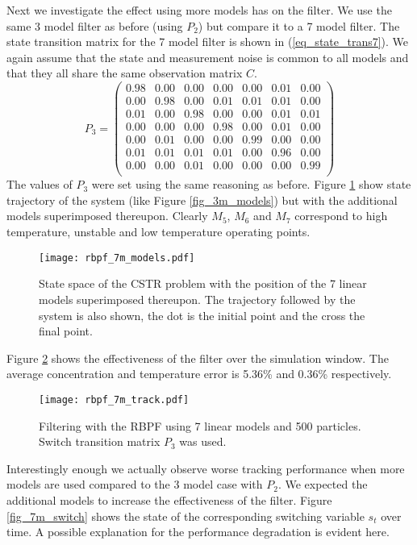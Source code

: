Next we investigate the effect using more models has on the filter. We use the same 3 model filter as before (using $P_2$) but compare it to a 7 model filter. The state transition matrix for the 7 model filter is shown in (\ref{eq_state_trans7}). We again assume that the state and measurement noise is common to all models and that they all share the same observation  matrix $C$.
\begin{equation}
P_3 = \begin{pmatrix}
0.98 & 0.00 & 0.00 & 0.00 & 0.00 & 0.01 & 0.00 \\
0.00 & 0.98 & 0.00 & 0.01 & 0.01 & 0.01 & 0.00 \\
0.01 & 0.00 & 0.98 & 0.00 & 0.00 & 0.01 & 0.01 \\
0.00 & 0.00 & 0.00 & 0.98 & 0.00 & 0.01 & 0.00 \\
0.00 & 0.01 & 0.00 & 0.00 & 0.99 & 0.00 & 0.00 \\
0.01 & 0.01 & 0.01 & 0.01 & 0.00 & 0.96 & 0.00 \\
0.00 & 0.00 & 0.01 & 0.00 & 0.00 & 0.00 & 0.99 \\
\end{pmatrix}
\label{eq_state_trans7}
\end{equation}
The values of $P_3$ were set using the same reasoning as before. Figure \ref{fig_7m_models} show state trajectory of the system (like Figure \ref{fig_3m_models}) but with the additional models superimposed thereupon. Clearly $M_5$, $M_6$ and $M_7$ correspond to high temperature, unstable and low temperature operating points. 
\begin{figure}[H] 
\centering
\texttt{[image: rbpf\_7m\_models.pdf]}
\caption{State space of the CSTR problem with the position of the 7 linear models superimposed thereupon. The trajectory followed by the system is also shown, the dot is the initial point and the cross the final point.}
\label{fig_7m_models}
\end{figure}
Figure \ref{fig_7m_track} shows the effectiveness of the filter over the simulation window. The average concentration and temperature error is 5.36\% and 0.36\% respectively. 
\begin{figure}[H] 
\centering
\texttt{[image: rbpf\_7m\_track.pdf]}
\caption{Filtering with the RBPF using 7 linear models and 500 particles. Switch transition matrix $P_3$ was used.}
\label{fig_7m_track}
\end{figure}
Interestingly enough we actually observe worse tracking performance when more models are used compared to the 3 model case with $P_2$. We expected the additional models to increase the effectiveness of the filter. Figure \ref{fig_7m_switch} shows the state of the corresponding switching variable $s_t$ over time. A possible explanation for the performance degradation is evident here.
